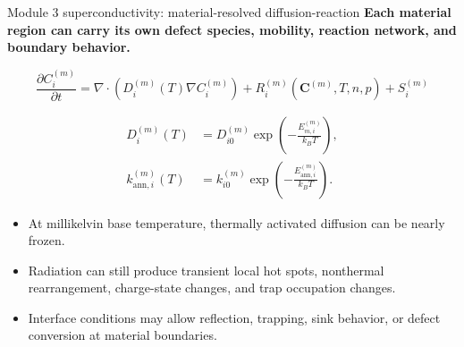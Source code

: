 \documentclass[aspectratio=169,10pt]{beamer}
\begin{document}
\begin{frame}{Module 3 superconductivity: material-resolved diffusion-reaction}
\footnotesize
\textbf{Each material region can carry its own defect species, mobility, reaction network, and boundary behavior.}

\vspace{-0.15em}
\begin{equation*}
\boxed{
\frac{\partial C_i^{(m)}}{\partial t}
=\nabla\cdot\left(D_i^{(m)}(T)\nabla C_i^{(m)}\right)
+R_i^{(m)}(\mathbf C^{(m)},T,n,p)
+S_i^{(m)}
}
\end{equation*}

\vspace{-0.2em}
\begin{align*}
D_i^{(m)}(T)&=D_{i0}^{(m)}\exp\!\left(-\frac{E_{m,i}^{(m)}}{k_BT}\right),\\[-0.05em]
k_{\mathrm{ann},i}^{(m)}(T)&=k_{i0}^{(m)}\exp\!\left(-\frac{E_{\mathrm{ann},i}^{(m)}}{k_BT}\right).
\end{align*}

\vspace{-0.2em}
\begin{itemize}
    \item At millikelvin base temperature, thermally activated diffusion can be nearly frozen.
    \item Radiation can still produce transient local hot spots, nonthermal rearrangement, charge-state changes, and trap occupation changes.
    \item Interface conditions may allow reflection, trapping, sink behavior, or defect conversion at material boundaries.
\end{itemize}
\end{frame}
\end{document}
